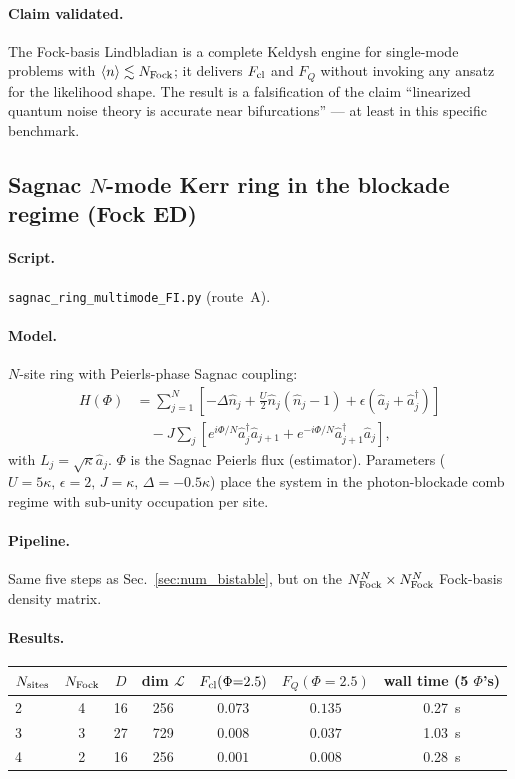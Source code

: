 \documentclass[11pt]{article}
\begin{document}
\paragraph{Claim validated.}  The Fock-basis Lindbladian is a complete
Keldysh engine for single-mode problems with $\langle n\rangle \lesssim
N_{\rm Fock}$; it delivers $F_{\rm cl}$ and $F_Q$ without invoking any
ansatz for the likelihood shape.  The result is a falsification of the
claim ``linearized quantum noise theory is accurate near bifurcations''
--- at least in this specific benchmark.

\subsection{Sagnac $N$-mode Kerr ring in the blockade regime (Fock ED)}
\label{sec:num_sagnac_ring}

\paragraph{Script.} \texttt{sagnac\_ring\_multimode\_FI.py} (route~A).

\paragraph{Model.} $N$-site ring with Peierls-phase Sagnac coupling:
\begin{align}
  H(\Phi) &= \sum_{j=1}^N\left[-\Delta\hat n_j
       + \tfrac{U}{2}\hat n_j(\hat n_j-1)
       + \epsilon(\hat a_j+\hat a_j^\dag)\right]\nonumber\\
  &\quad - J\sum_j \left[e^{i\Phi/N}\hat a_j^\dag\hat a_{j+1}
       + e^{-i\Phi/N}\hat a_{j+1}^\dag\hat a_j\right],
\end{align}
with $L_j = \sqrt{\kappa}\hat a_j$.  $\Phi$ is the Sagnac Peierls flux
(estimator).  Parameters ($U=5\kappa,\,\epsilon=2,\,J=\kappa,\,
\Delta=-0.5\kappa$) place the system in the photon-blockade comb regime
with sub-unity occupation per site.

\paragraph{Pipeline.}  Same five steps as Sec.~\ref{sec:num_bistable},
but on the $N_{\rm Fock}^N\times N_{\rm Fock}^N$ Fock-basis density
matrix.

\paragraph{Results.}
\begin{center}\small
\begin{tabular}{lcccccc}
\toprule
$N_{\rm sites}$ & $N_{\rm Fock}$ & $D$ &
dim $\mathcal{L}$ &
$F_{\rm cl}(\Phi{=}2.5)$ & $F_Q(\Phi{=}2.5)$ & wall time (5 $\Phi$'s) \\
\midrule
2 & 4 & 16 & 256 & $0.073$ & $0.135$ & 0.27~s \\
3 & 3 & 27 & 729 & $0.008$ & $0.037$ & 1.03~s \\
4 & 2 & 16 & 256 & $0.001$ & $0.008$ & 0.28~s \\
\bottomrule
\end{tabular}
\end{center}
\end{document}
